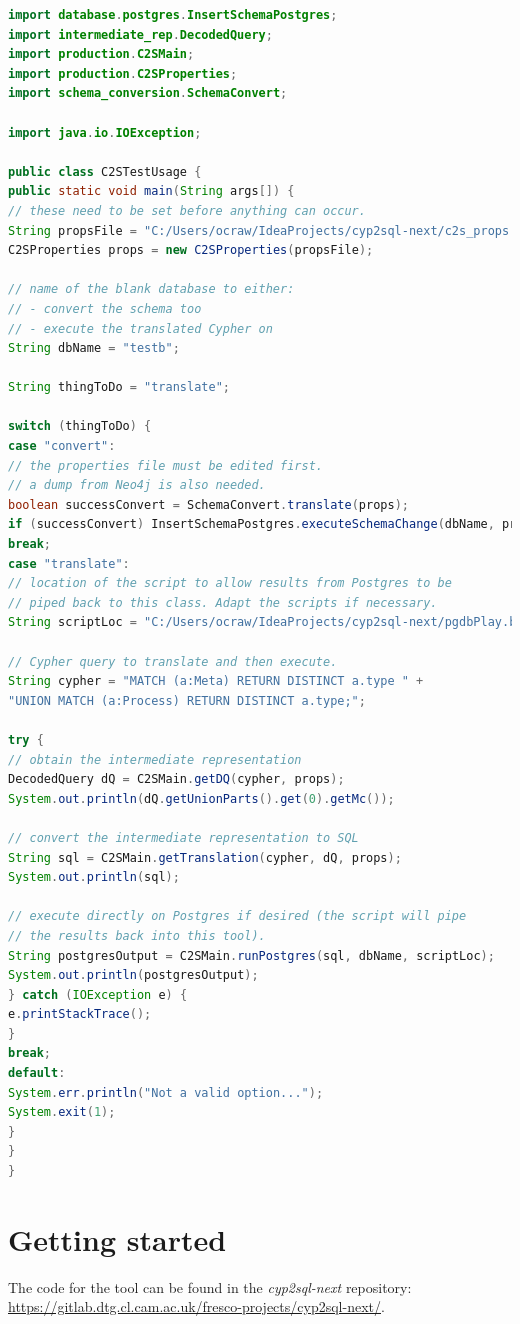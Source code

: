 \documentclass[letterpaper]{ltxdoc}
\begin{document}
\begin{lstlisting}[language=Java, breaklines=true]
import database.postgres.InsertSchemaPostgres;
import intermediate_rep.DecodedQuery;
import production.C2SMain;
import production.C2SProperties;
import schema_conversion.SchemaConvert;

import java.io.IOException;

public class C2STestUsage {
public static void main(String args[]) {
// these need to be set before anything can occur.
String propsFile = "C:/Users/ocraw/IdeaProjects/cyp2sql-next/c2s_props.properties";
C2SProperties props = new C2SProperties(propsFile);

// name of the blank database to either:
// - convert the schema too
// - execute the translated Cypher on
String dbName = "testb";

String thingToDo = "translate";

switch (thingToDo) {
case "convert":
// the properties file must be edited first.
// a dump from Neo4j is also needed.
boolean successConvert = SchemaConvert.translate(props);
if (successConvert) InsertSchemaPostgres.executeSchemaChange(dbName, props);
break;
case "translate":
// location of the script to allow results from Postgres to be
// piped back to this class. Adapt the scripts if necessary.
String scriptLoc = "C:/Users/ocraw/IdeaProjects/cyp2sql-next/pgdbPlay.bat";

// Cypher query to translate and then execute.
String cypher = "MATCH (a:Meta) RETURN DISTINCT a.type " +
"UNION MATCH (a:Process) RETURN DISTINCT a.type;";

try {
// obtain the intermediate representation
DecodedQuery dQ = C2SMain.getDQ(cypher, props);
System.out.println(dQ.getUnionParts().get(0).getMc());

// convert the intermediate representation to SQL
String sql = C2SMain.getTranslation(cypher, dQ, props);
System.out.println(sql);

// execute directly on Postgres if desired (the script will pipe
// the results back into this tool).
String postgresOutput = C2SMain.runPostgres(sql, dbName, scriptLoc);
System.out.println(postgresOutput);
} catch (IOException e) {
e.printStackTrace();
}
break;
default:
System.err.println("Not a valid option...");
System.exit(1);
}
}
}
\end{lstlisting}

\section{Getting started}
The code for the tool can be found in the \emph{cyp2sql-next} repository: \url{https://gitlab.dtg.cl.cam.ac.uk/fresco-projects/cyp2sql-next/}.
\end{document}

